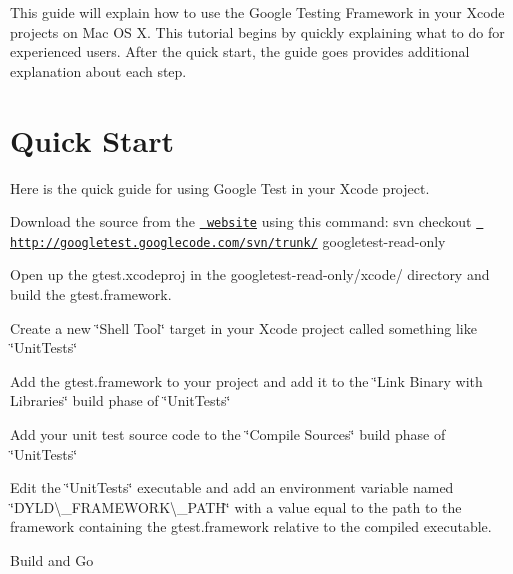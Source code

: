 This guide will explain how to use the Google Testing Framework in your Xcode projects on Mac OS X. This tutorial begins by quickly explaining what to do for experienced users. After the quick start, the guide goes provides additional explanation about each step.

\section*{Quick Start}

Here is the quick guide for using Google Test in your Xcode project.


\begin{DoxyEnumerate}
\item Download the source from the \href{http://code.google.com/p/googletest}\texttt{ website} using this command\+: {\ttfamily svn checkout \href{http://googletest.googlecode.com/svn/trunk/}\texttt{ http\+://googletest.\+googlecode.\+com/svn/trunk/} googletest-\/read-\/only}
\end{DoxyEnumerate}
\begin{DoxyEnumerate}
\item Open up the {\ttfamily gtest.\+xcodeproj} in the {\ttfamily googletest-\/read-\/only/xcode/} directory and build the gtest.\+framework.
\end{DoxyEnumerate}
\begin{DoxyEnumerate}
\item Create a new \char`\"{}\+Shell Tool\char`\"{} target in your Xcode project called something like \char`\"{}\+Unit\+Tests\char`\"{}
\end{DoxyEnumerate}
\begin{DoxyEnumerate}
\item Add the gtest.\+framework to your project and add it to the \char`\"{}\+Link Binary with Libraries\char`\"{} build phase of \char`\"{}\+Unit\+Tests\char`\"{}
\end{DoxyEnumerate}
\begin{DoxyEnumerate}
\item Add your unit test source code to the \char`\"{}\+Compile Sources\char`\"{} build phase of \char`\"{}\+Unit\+Tests\char`\"{}
\end{DoxyEnumerate}
\begin{DoxyEnumerate}
\item Edit the \char`\"{}\+Unit\+Tests\char`\"{} executable and add an environment variable named \char`\"{}\+D\+Y\+L\+D\textbackslash{}\+\_\+\+F\+R\+A\+M\+E\+W\+O\+R\+K\textbackslash{}\+\_\+\+P\+A\+T\+H\char`\"{} with a value equal to the path to the framework containing the gtest.\+framework relative to the compiled executable.
\end{DoxyEnumerate}
\begin{DoxyEnumerate}
\item Build and Go
\end{DoxyEnumerate}

